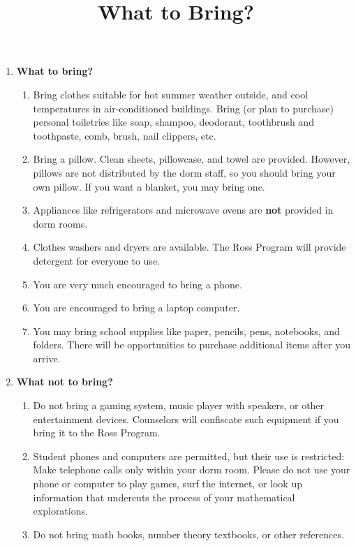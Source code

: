 \documentclass[11pt]{ross}
\title{What to Bring?}
\begin{document}
\maketitle
 \begin{enumerate}[label=(\arabic*),itemsep=2em,topsep=-1em]

\item \textbf{What to bring?}
 \begin{enumerate}[label=(\alph*),itemsep=0.5em,topsep=0em]
 \item Bring clothes suitable for hot summer weather outside, and cool
   temperatures in air-conditioned buildings.  Bring (or plan to
   purchase) personal toiletries like soap, shampoo, deodorant,
   toothbrush and toothpaste, comb, brush, nail clippers, etc.
 \item Bring a pillow.  Clean sheets, pillowcase, and towel are
provided.  However, pillows are not distributed by the dorm staff, so
you should bring your own pillow.  If you want a blanket, you may
bring one.
 \item Appliances like refrigerators and microwave ovens are \textbf{not} provided in dorm rooms.
 \item Clothes washers and dryers are available.  The Ross Program
will provide detergent for everyone to use.
  \item You are very much encouraged to bring a phone.
  \item You are encouraged to bring a laptop computer.
 \item  You may bring school supplies like paper, 
   pencils, pens, notebooks, and folders. There will be opportunities 
   to purchase additional items after you arrive.
\end{enumerate}
\item \textbf{What not to bring?}
  \begin{enumerate}[label=(\alph*),itemsep=0.5em,topsep=0em]
  \item Do not bring a gaming system, music player with speakers, 
    or other entertainment devices.  
    Counselors will confiscate such equipment if you bring it to the
    Ross Program.
  \item Student phones and computers are permitted, but their use is
    restricted: Make telephone calls only within your dorm room.
    Please do not use your phone or computer to play games, surf the internet, or
    look up information that undercuts the process of your
    mathematical explorations.
  \item Do not bring math books, number theory textbooks, or other references.  

\end{enumerate}
\end{enumerate}
\end{document}
